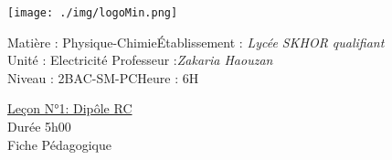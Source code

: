 \documentclass[12pt]{article}
\newcommand\headerMe[2]{\noindent{}#1\hfill#2}
\begin{document}
\begin{center}
	\texttt{[image: ./img/logoMin.png]}
	\vspace{-3cm}
\end{center}
\headerMe{Matière : Physique-Chimie}{Établissement : \emph{Lycée SKHOR qualifiant}}\\
\headerMe{ Unité : Electricité}{  Professeur :\emph{Zakaria Haouzan}}\\
\headerMe{Niveau : 2BAC-SM-PC}{Heure : 6H}\\

\begin{center}
	\underline{Leçon N°1: Dipôle RC}\\
	Durée 5h00
	\\
	\vspace{.2cm}
	\hrulefill
	\Large{Fiche Pédagogique}
	\hrulefill\\
\end{center}
\end{document}
